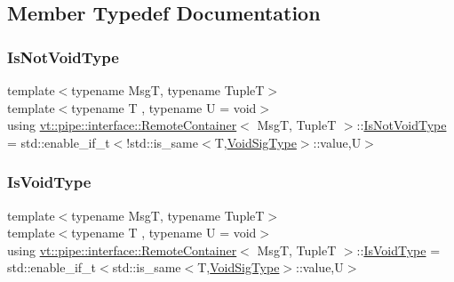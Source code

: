 \subsection{Member Typedef Documentation}
\mbox{\label{structvt_1_1pipe_1_1interface_1_1_remote_container_a1dc69f6cfa1318c856a412940e3dbb50}} 
\subsubsection{\texorpdfstring{Is\+Not\+Void\+Type}{IsNotVoidType}}
{\footnotesize\ttfamily template$<$typename MsgT, typename TupleT$>$ \\
template$<$typename T , typename U  = void$>$ \\
using \hyperlink{structvt_1_1pipe_1_1interface_1_1_remote_container}{vt\+::pipe\+::interface\+::\+Remote\+Container}$<$ MsgT, TupleT $>$\+::\hyperlink{structvt_1_1pipe_1_1interface_1_1_remote_container_a1dc69f6cfa1318c856a412940e3dbb50}{Is\+Not\+Void\+Type} =  std\+::enable\+\_\+if\+\_\+t$<$!std\+::is\+\_\+same$<$T,\hyperlink{structvt_1_1pipe_1_1interface_1_1_remote_container_a04acc410a9a9da0ec211043db91b7559}{Void\+Sig\+Type}$>$\+::value,U$>$}

\mbox{\label{structvt_1_1pipe_1_1interface_1_1_remote_container_a0cf5387a6b1db885a7a224bab60ce16d}} 
\subsubsection{\texorpdfstring{Is\+Void\+Type}{IsVoidType}}
{\footnotesize\ttfamily template$<$typename MsgT, typename TupleT$>$ \\
template$<$typename T , typename U  = void$>$ \\
using \hyperlink{structvt_1_1pipe_1_1interface_1_1_remote_container}{vt\+::pipe\+::interface\+::\+Remote\+Container}$<$ MsgT, TupleT $>$\+::\hyperlink{structvt_1_1pipe_1_1interface_1_1_remote_container_a0cf5387a6b1db885a7a224bab60ce16d}{Is\+Void\+Type} =  std\+::enable\+\_\+if\+\_\+t$<$std\+::is\+\_\+same$<$T,\hyperlink{structvt_1_1pipe_1_1interface_1_1_remote_container_a04acc410a9a9da0ec211043db91b7559}{Void\+Sig\+Type}$>$\+::value,U$>$}


